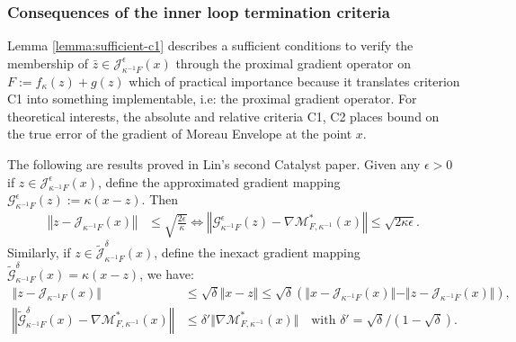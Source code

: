 \documentclass[12pt]{article}
\begin{document}
        \subsubsection{Consequences of the inner loop termination criteria}
            Lemma \ref{lemma:sufficient-c1} describes a sufficient conditions to verify the membership of $\bar z \in \mathcal J_{\kappa^{-1}F}^\epsilon (x)$ through the proximal gradient operator on $F:= f_\kappa(z) + g(z)$ which of practical importance because it translates criterion C1 into something implementable, i.e: the proximal gradient operator. 
            For theoretical interests, the absolute and relative criteria C1, C2 places bound on the true error of the gradient of Moreau Envelope at the point $x$. 
            \par 
            The following are results proved in Lin's second Catalyst paper. 
            Given any $\epsilon > 0$ if $z \in \mathcal J_{\kappa^{-1}F}^\epsilon (x)$, define the approximated gradient mapping $\mathcal G_{\kappa^{-1}F}^\epsilon (z) := \kappa(x - z)$.
            Then
            \begin{align*}
                \left\Vert z - \mathcal J_{\kappa^{-1}F} (x)\right\Vert
                &\le \sqrt{\frac{2\epsilon}{\kappa}} 
                \iff 
                \left\Vert
                    \mathcal G_{\kappa^{-1}F}^\epsilon(z) 
                    - \nabla \mathcal M_{F, \kappa^{-1}}^*(x)
                \right\Vert 
                \le \sqrt{2\kappa\epsilon}. 
            \end{align*}
            Similarly, if $z \in \widetilde{\mathcal J}_{\kappa^{-1}F}^\delta(x)$, define the inexact gradient mapping $\widetilde{\mathcal G}_{\kappa^{-1}F}^\delta(x) = \kappa(x - z)$, we have: 
            \begin{align*}
                \Vert z - \mathcal J_{\kappa^{-1}F}(x)\Vert 
                &\le \sqrt{\delta}\Vert x - z\Vert 
                \le \sqrt{\delta}(
                    \Vert x - \mathcal J_{\kappa^{-1}F} (x) \Vert 
                    - \Vert z - \mathcal J_{\kappa^{-1}F} (x) \Vert
                ), 
                \\
                \left\Vert 
                    \widetilde{\mathcal G}_{\kappa^{-1}F}^\delta(x) - 
                    \nabla \mathcal M^*_{F, \kappa^{-1}}(x) 
                \right\Vert
                &\le 
                \delta' \Vert \nabla \mathcal M^*_{F, \kappa^{-1}}(x) \Vert \quad 
                \text{with } \delta' = \sqrt{\delta}/\left(1 - \sqrt{\delta}\right). 
            \end{align*}
\end{document}
